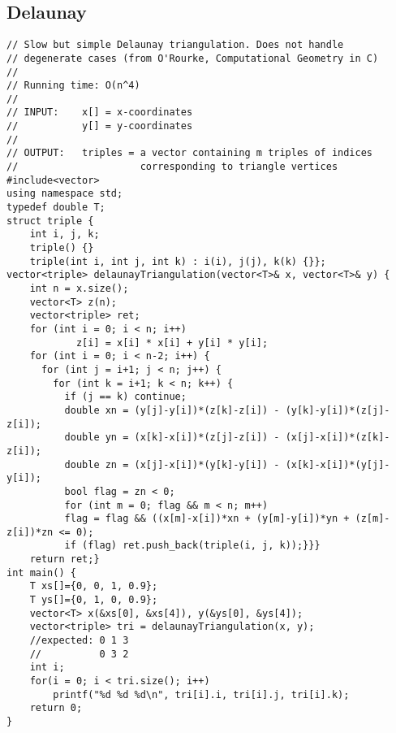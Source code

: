 \documentclass[8pt, oneside]{extarticle}
\begin{document}
\begin{multicols}{3}
\subsection{Delaunay}
\begin{lstlisting}
// Slow but simple Delaunay triangulation. Does not handle
// degenerate cases (from O'Rourke, Computational Geometry in C)
//
// Running time: O(n^4)
//
// INPUT:    x[] = x-coordinates
//           y[] = y-coordinates
//
// OUTPUT:   triples = a vector containing m triples of indices
//                     corresponding to triangle vertices
#include<vector>
using namespace std;
typedef double T;
struct triple {
    int i, j, k;
    triple() {}
    triple(int i, int j, int k) : i(i), j(j), k(k) {}};
vector<triple> delaunayTriangulation(vector<T>& x, vector<T>& y) {
    int n = x.size();
    vector<T> z(n);
    vector<triple> ret;
    for (int i = 0; i < n; i++)
            z[i] = x[i] * x[i] + y[i] * y[i];
    for (int i = 0; i < n-2; i++) {
      for (int j = i+1; j < n; j++) {
        for (int k = i+1; k < n; k++) {
          if (j == k) continue;
          double xn = (y[j]-y[i])*(z[k]-z[i]) - (y[k]-y[i])*(z[j]-z[i]);
          double yn = (x[k]-x[i])*(z[j]-z[i]) - (x[j]-x[i])*(z[k]-z[i]);
          double zn = (x[j]-x[i])*(y[k]-y[i]) - (x[k]-x[i])*(y[j]-y[i]);
          bool flag = zn < 0;
          for (int m = 0; flag && m < n; m++)
          flag = flag && ((x[m]-x[i])*xn + (y[m]-y[i])*yn + (z[m]-z[i])*zn <= 0);
          if (flag) ret.push_back(triple(i, j, k));}}}
    return ret;}
int main() {
    T xs[]={0, 0, 1, 0.9};
    T ys[]={0, 1, 0, 0.9};
    vector<T> x(&xs[0], &xs[4]), y(&ys[0], &ys[4]);
    vector<triple> tri = delaunayTriangulation(x, y);
    //expected: 0 1 3
    //          0 3 2
    int i;
    for(i = 0; i < tri.size(); i++)
        printf("%d %d %d\n", tri[i].i, tri[i].j, tri[i].k);
    return 0;
}
\end{lstlisting}

\end{multicols}
\end{document}
